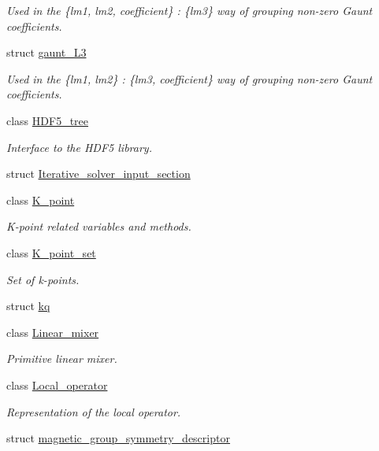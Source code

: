 \begin{DoxyCompactItemize}
\begin{DoxyCompactList}\small\item\em Used in the \{lm1, lm2, coefficient\} \+: \{lm3\} way of grouping non-\/zero Gaunt coefficients. \end{DoxyCompactList}\item 
struct \hyperlink{structsirius_1_1gaunt___l3}{gaunt\+\_\+\+L3}
\begin{DoxyCompactList}\small\item\em Used in the \{lm1, lm2\} \+: \{lm3, coefficient\} way of grouping non-\/zero Gaunt coefficients. \end{DoxyCompactList}\item 
class \hyperlink{classsirius_1_1_h_d_f5__tree}{H\+D\+F5\+\_\+tree}
\begin{DoxyCompactList}\small\item\em Interface to the H\+D\+F5 library. \end{DoxyCompactList}\item 
struct \hyperlink{structsirius_1_1_iterative__solver__input__section}{Iterative\+\_\+solver\+\_\+input\+\_\+section}
\item 
class \hyperlink{classsirius_1_1_k__point}{K\+\_\+point}
\begin{DoxyCompactList}\small\item\em K-\/point related variables and methods. \end{DoxyCompactList}\item 
class \hyperlink{classsirius_1_1_k__point__set}{K\+\_\+point\+\_\+set}
\begin{DoxyCompactList}\small\item\em Set of k-\/points. \end{DoxyCompactList}\item 
struct \hyperlink{structsirius_1_1kq}{kq}
\item 
class \hyperlink{classsirius_1_1_linear__mixer}{Linear\+\_\+mixer}
\begin{DoxyCompactList}\small\item\em Primitive linear mixer. \end{DoxyCompactList}\item 
class \hyperlink{classsirius_1_1_local__operator}{Local\+\_\+operator}
\begin{DoxyCompactList}\small\item\em Representation of the local operator. \end{DoxyCompactList}\item 
struct \hyperlink{structsirius_1_1magnetic__group__symmetry__descriptor}{magnetic\+\_\+group\+\_\+symmetry\+\_\+descriptor}

\end{DoxyCompactItemize}
